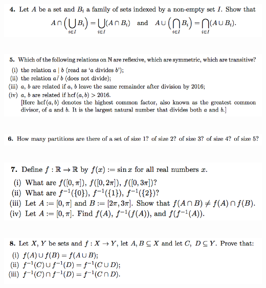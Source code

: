 \documentclass[12pt]{article}
\begin{document}
\subsection*{} %
\includegraphics[width=400pt]{img/iulm-1-4.png}
\begin{mdframed}
\end{mdframed}

\subsection*{} %
\includegraphics[width=400pt]{img/iulm-1-5.png}
\begin{mdframed}
\end{mdframed}

\subsection*{} %
\includegraphics[width=400pt]{img/iulm-1-6.png}
\begin{mdframed}
\end{mdframed}

\subsection*{} %
\includegraphics[width=400pt]{img/iulm-1-7.png}
\begin{mdframed}
\end{mdframed}

\subsection*{} %
\includegraphics[width=400pt]{img/iulm-1-8.png}
\begin{mdframed}
\end{mdframed}
\end{document}
